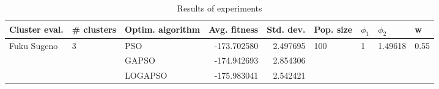 \begin{table}
\centering
\caption{Results of experiments}
\begin{tabular}{lllrrllll}
\toprule
               Cluster eval. &        \# clusters & Optim. algorithm &  Avg. fitness &  Std. dev. &            Pop. size &         $\phi_{1}$ &               $\phi_{2}$ &                     w \\
\midrule
\multirow{3}{*}{Fuku Sugeno} & \multirow{3}{*}{3} &              PSO &   -173.702580 &   2.497695 & \multirow{3}{*}{100} & \multirow{3}{*}{1} & \multirow{3}{*}{1.49618} & \multirow{3}{*}{0.55} \\
                             &                    &            GAPSO &   -174.942693 &   2.854306 &                      &                    &                          &                       \\
                             &                    &          LOGAPSO &   -175.983041 &   2.542421 &                      &                    &                          &                       \\
\bottomrule
\end{tabular}
\end{table}
